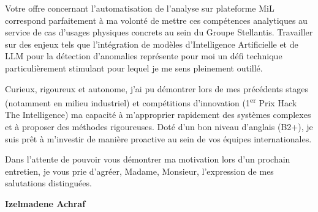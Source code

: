 \documentclass[10pt,a4paper]{altacv}
\begin{document}
\vspace{0.4cm}

Votre offre concernant l'automatisation de l'analyse sur plateforme MiL correspond parfaitement à ma volonté de mettre ces compétences analytiques au service de cas d'usages physiques concrets au sein du Groupe Stellantis. Travailler sur des enjeux tels que l'intégration de modèles d'Intelligence Artificielle et de LLM pour la détection d'anomalies représente pour moi un défi technique particulièrement stimulant pour lequel je me sens pleinement outillé.

\vspace{0.4cm}

Curieux, rigoureux et autonome, j'ai pu démontrer lors de mes précédents stages (notamment en milieu industriel) et compétitions d'innovation (1\textsuperscript{er} Prix Hack The Intelligence) ma capacité à m'approprier rapidement des systèmes complexes et à proposer des méthodes rigoureuses. Doté d'un bon niveau d'anglais (B2+), je suis prêt à m'investir de manière proactive au sein de vos équipes internationales.

\vspace{0.4cm}

Dans l'attente de pouvoir vous démontrer ma motivation lors d'un prochain entretien, je vous prie d'agréer, Madame, Monsieur, l'expression de mes salutations distinguées.

\vspace{0.5cm}

\vfill

\begin{flushright}
  \Large\color{emphasis}\textbf{Izelmadene Achraf}
\end{flushright}
\end{document}
